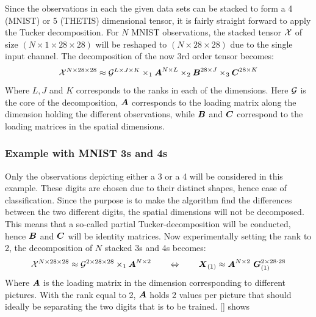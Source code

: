 Since the observations in each the given data sets can be stacked to form a 4 (MNIST) or 5 (THETIS) dimensional tensor, it is fairly straight forward to apply the Tucker decomposition. For $N$ MNIST observations, the stacked tensor $\mathcal{X}$ of size $(N \times 1 \times 28 \times 28)$ will be reshaped to $(N\times 28 \times 28)$ due to the single input channel. The decomposition of the now 3rd order tensor becomes:
\begin{equation}
    \mathcal{X}^{N\times 28 \times 28} \approx \mathcal{G}^{L\times J \times K} \times_1 \boldsymbol{A}^{N\times L} \times_2 \boldsymbol{B}^{28 \times J} \times_3 \boldsymbol{C}^{28 \times K}
\end{equation}
Where $L, J$ and $K$ corresponds to the ranks in each of the dimensions. Here $\mathcal{G}$ is the core of the decomposition, $\boldsymbol{A}$ corresponds to the loading matrix along the dimension holding the different observations, while $\boldsymbol{B}$ and $\boldsymbol{C}$ correspond to the loading matrices in the spatial dimensions.

\subsubsection{Example with MNIST 3s and 4s}
Only the observations depicting either a 3 or a 4 will be considered in this example. These digits are chosen due to their distinct shapes, hence ease of classification. Since the purpose is to make the algorithm find the differences between the two different digits, the spatial dimensions will not be decomposed. This means that a so-called partial Tucker-decomposition will be conducted, hence $\boldsymbol{B}$ and $\boldsymbol{C}$ will be identity matrices. Now experimentally setting the rank to 2, the decomposition of $N$ stacked 3s and 4s becomes:
\begin{equation}
    \tensor{X}^{N\times 28\times 28} \approx \tensor{G}^{2 \times 28 \times 28} \times_1 \bs{A}^{N\times 2} \qquad \Leftrightarrow \qquad \bs{X}_{(1)} \approx \bs{A}^{N\times 2} \ \bs{G}^{2 \times 28\cdot 28}_{(1)}
\end{equation}
Where $\boldsymbol{A}$ is the loading matrix in the dimension corresponding to different pictures. With the rank equal to 2, $\boldsymbol{A}$ holds 2 values per picture that should ideally be separating the two digits that is to be trained. \autoref{} shows 

